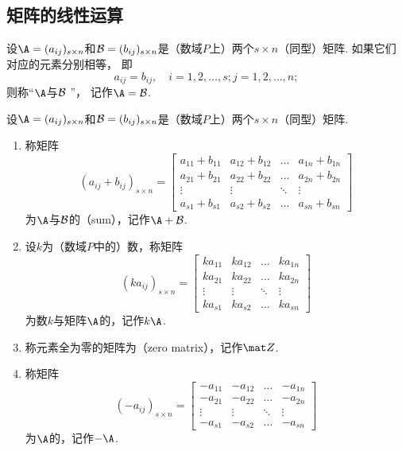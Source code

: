 \subsection{矩阵的线性运算}
\begin{definition}
设\(\A=(a_{ij})_{s \times n}\)和\(\mathcal{B}=(b_{ij})_{s \times n}\)是（数域\(P\)上）两个\(s \times n\)（同型）矩阵.
如果它们对应的元素分别相等，
即\[
	a_{ij} = b_{ij},
	\quad
	i=1,2,\dotsc,s;
	j=1,2,\dotsc,n;
\]
则称“\(\A\)与\(\mathcal{B}\) ”，
记作\(\A=\B\).
\end{definition}

\begin{definition}
设\(\A=(a_{ij})_{s \times n}\)和\(\mathcal{B}=(b_{ij})_{s \times n}\)是（数域\(P\)上）两个\(s \times n\)（同型）矩阵.
\begin{enumerate}
\item 称矩阵\[
(a_{ij} + b_{ij})_{s \times n} = \begin{bmatrix}
a_{11}+b_{11} & a_{12}+b_{12} & \dots & a_{1n}+b_{1n} \\
a_{21}+b_{21} & a_{22}+b_{22} & \dots & a_{2n}+b_{2n} \\
\vdots & \vdots & \ddots & \vdots \\
a_{s1}+b_{s1} & a_{s2}+b_{s2} & \dots & a_{sn}+b_{sn}
\end{bmatrix}
\]为\(\A\)与\(\mathcal{B}\)的（sum），记作\(\A+\B\).
\item 设\(k\)为（数域\(P\)中的）数，称矩阵\[
(ka_{ij})_{s \times n} = \begin{bmatrix}
ka_{11} & ka_{12} & \dots & ka_{1n} \\
ka_{21} & ka_{22} & \dots & ka_{2n} \\
\vdots & \vdots & \ddots & \vdots \\
ka_{s1} & ka_{s2} & \dots & ka_{sn}
\end{bmatrix}
\]为数\(k\)与矩阵\(\A\)的，记作\(k\A\).
\item 称元素全为零的矩阵为（zero matrix），记作\(\z\).
\item 称矩阵\[
(-a_{ij})_{s \times n}=\begin{bmatrix}
-a_{11} & -a_{12} & \dots & -a_{1n} \\
-a_{21} & -a_{22} & \dots & -a_{2n} \\
\vdots & \vdots & \ddots & \vdots \\
-a_{s1} & -a_{s2} & \dots & -a_{sn}
\end{bmatrix}
\]为\(\A\)的，记作\(-\A\).
\end{enumerate}
\end{definition}

